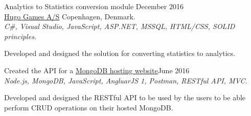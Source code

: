 \documentclass[margin, 10pt, hidelinks]{res} %
\begin{document}
\begin{resume}
Analytics to Statistics conversion module \hfill December 2016  \\
\href{https://hugogames.com/}{\underline{Hugo Games A/S}} \hfill Copenhagen, Denmark. \\
{\it C\#, Visual Studio, JavaScript, ASP.NET, MSSQL, HTML/CSS, SOLID principles.}
\begin{description}
\item Developed and designed the solution for converting statistics to analytics.
\end{description}

Created the API for a \href{https://Eliise_S@bitbucket.org/Eliise_S/mongodbhosting.git}{\underline{MongoDB hosting website}}\hfill June 2016  \\
{\it Node.js, MongoDB, JavaScript, AngluarJS 1, Postman, RESTful API, MVC.}
\begin{description}
\item Developed and designed the RESTful API to be used by the users to be able perform CRUD operations on their hosted MongoDB.
\end{description}




\end{resume}
\end{document}
